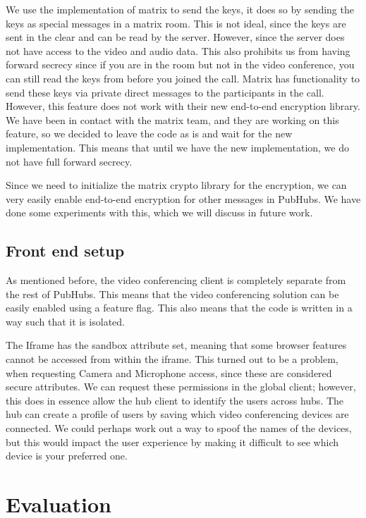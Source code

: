 \documentclass{report}
\begin{document}
We use the implementation of matrix to send the keys, it does so by sending the keys as special messages in a matrix
room. This is not ideal, since the keys are sent in the clear and can be read by the server. However, since the
server does not have access to the video and audio data. This also prohibits us from having forward secrecy since
if you are in the room but not in the video conference, you can still read the keys from before you joined the call.
Matrix has functionality to send these keys via private direct messages to the participants in the call. However, this
feature does not work with their new end-to-end encryption library. We have been in contact with the matrix team, and
they are working on this feature, so we decided to leave the code as is and wait for the new implementation. This
means that until we have the new implementation, we do not have full forward secrecy.

Since we need to initialize the matrix crypto library for the encryption, we can very easily enable end-to-end
encryption for other messages in PubHubs. We have done some experiments with this, which we will discuss in future
work.

\section{Front end setup}
As mentioned before, the video conferencing client is completely separate from the rest of PubHubs. This means that
the video conferencing solution can be easily enabled using a feature flag. This also means that the code is
written in a way such that it is isolated.

The Iframe has the sandbox attribute set, meaning that some browser features cannot be accessed from within the
iframe. This turned out to be a problem, when requesting Camera and Microphone access, since these are considered
secure attributes. We can request these permissions in the global client; however, this does in essence allow the
hub client to identify the users across hubs. The hub can create a profile of users by saving which video
conferencing devices are connected. We could perhaps work out a way to spoof the names of the devices, but this
would impact the user experience by making it difficult to see which device is your preferred one.


\chapter{Evaluation}
\end{document}
